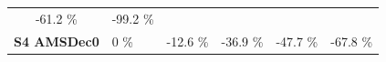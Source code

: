 \documentclass[]{article}
\begin{document}
\begin{longtable}[]{@{}clllll@{}}
\begin{minipage}[t]{0.13\columnwidth}
-61.2 \%\strut
\end{minipage} & \begin{minipage}[t]{0.13\columnwidth}\raggedright\strut
-99.2 \%\strut
\end{minipage}\tabularnewline
\begin{minipage}[t]{0.18\columnwidth}\centering\strut
\textbf{S4 AMSDec0}\strut
\end{minipage} & \begin{minipage}[t]{0.13\columnwidth}\raggedright\strut
0 \%\strut
\end{minipage} & \begin{minipage}[t]{0.13\columnwidth}\raggedright\strut
-12.6 \%\strut
\end{minipage} & \begin{minipage}[t]{0.13\columnwidth}\raggedright\strut
-36.9 \%\strut
\end{minipage} & \begin{minipage}[t]{0.13\columnwidth}\raggedright\strut
-47.7 \%\strut
\end{minipage} & \begin{minipage}[t]{0.13\columnwidth}\raggedright\strut
-67.8 \%\strut
\end{minipage}\tabularnewline
\bottomrule
\end{longtable}
\end{document}
